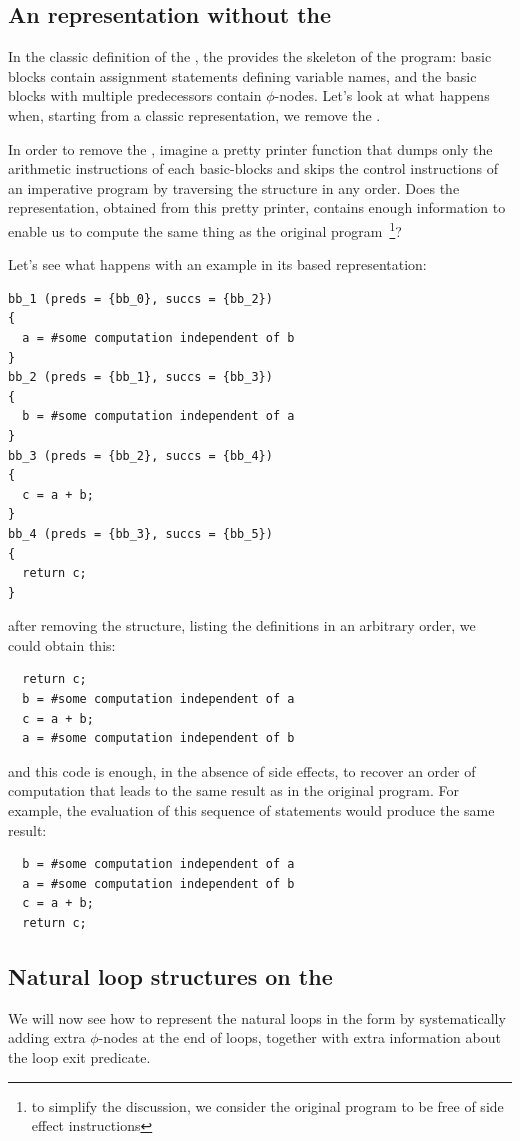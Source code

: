 \subsection{An \SSA{} representation without the \CFG{}}

In the classic definition of the \SSA{}, the \CFG{} provides the
skeleton of the program: basic blocks contain assignment statements
defining \SSA{} variable names, and the basic blocks with multiple
predecessors contain $\phi$-nodes.  Let's look at what happens when,
starting from a classic \SSA{} representation, we remove the \CFG{}.

In order to remove the \CFG{}, imagine a pretty printer function that dumps only the arithmetic instructions of each basic-blocks and skips the control instructions of an imperative program by traversing the \CFG{} structure in any order.  Does the representation, obtained from
this pretty printer, contains enough information to enable us to
compute the same thing as the original program~\footnote{to simplify the discussion, we consider the original program to be free of side effect instructions}?

Let's see what happens with an example in its \CFG{} based \SSA{} representation:
\begin{verbatim}
bb_1 (preds = {bb_0}, succs = {bb_2})
{
  a = #some computation independent of b
}
bb_2 (preds = {bb_1}, succs = {bb_3})
{
  b = #some computation independent of a
}
bb_3 (preds = {bb_2}, succs = {bb_4})
{
  c = a + b;
}
bb_4 (preds = {bb_3}, succs = {bb_5})
{
  return c;
}
\end{verbatim}
after removing the \CFG{} structure, listing the definitions in an
arbitrary order, we could obtain this:
\begin{verbatim}
  return c;
  b = #some computation independent of a
  c = a + b;
  a = #some computation independent of b
\end{verbatim}
and this \SSA{} code is enough, in the absence of side effects, to
recover an order of computation that leads to the same result as in
the original program.  For example, the evaluation of this sequence of
statements would produce the same result:
\begin{verbatim}
  b = #some computation independent of a
  a = #some computation independent of b
  c = a + b;
  return c;
\end{verbatim}

\subsection{Natural loop structures on the \SSA{}}
We will now see how to represent the natural loops in the \SSA{} form
by systematically adding extra $\phi$-nodes at the end of loops, together
with extra information about the loop exit predicate.

